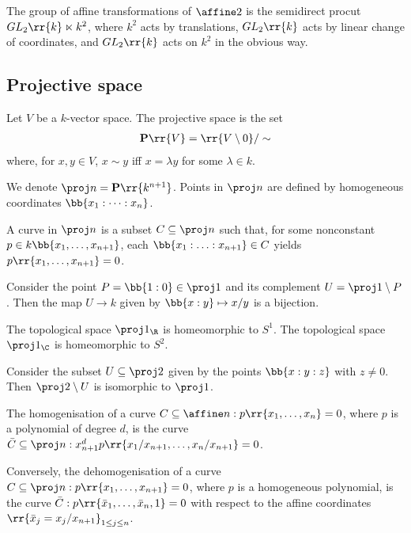 \documentclass{article}
\begin{document}
\begin{proposition}
  The group of affine transformations of $\affine 2$ is the semidirect procut
  $GL_2\rr{k}\ltimes k^2$, where $k^2$ acts by translations, $GL_2\rr{k}$ acts by
  linear change of coordinates, and $GL_2\rr{k}$ acts on $k^2$ in the obvious way.
\end{proposition}

\subsection{Projective space}\label{sec:projective_space}

\begin{definition}
  Let $V$ be a $k$-vector space. The projective space is the set
  \begin{align*}
    \mathbf P\rr{V} = \rr{V\setminus 0} / \sim
  \end{align*}
  where, for $x,y\in V$, $x\sim y$ iff $x=\lambda y$ for some $\lambda\in k$.

  We denote $\proj n = \mathbf P\rr{k^{n+1}}$.
  Points in $\proj n$ are defined by homogeneous coordinates
  $\bb{x_1 : \cdots : x_n}$.
\end{definition}

\begin{definition}
  A curve in $\proj n$ is a subset $C\subseteq\proj n$ such that, for some
  nonconstant $p\in k\bb{x_1,\ldots,x_{n+1}}$, each $\bb{x_1:\ldots:x_{n+1}}\in C$
  yields $p\rr{x_1,\ldots,x_{n+1}}=0$.
\end{definition}

\begin{proposition}
  Consider the point $P=\bb{1:0}\in\proj 1$ and its complement
  $U=\proj 1\setminus P$. Then the map $U\to k$ given by $\bb{x:y}\mapsto x/y$
  is a bijection.
\end{proposition}

\begin{theorem}
  The topological space $\proj 1_{\R}$ is homeomorphic to $S^1$. The topological space
  $\proj 1_{\C}$ is homeomorphic to $S^2$.
\end{theorem}

\begin{proposition}
  Consider the subset $U\subseteq\proj 2$ given by the points $\bb{x:y:z}$ with
  $z\neq 0$. Then $\proj 2\setminus U$ is isomorphic to $\proj 1$.
\end{proposition}

\begin{definition}
  The homogenisation of a curve $C\subseteq\affine n:p\rr{x_1,\ldots,x_n}=0$, where
  $p$ is a polynomial of degree $d$, is the curve
  $\bar C\subseteq\proj n:x_{n+1}^d p\rr{x_1/x_{n+1},\ldots,x_n/x_{n+1}}=0$.

  Conversely, the dehomogenisation of a curve $C\subseteq\proj n:p\rr{x_1,\ldots,x_{n+1}}=0$,
  where $p$ is a homogeneous polynomial, is the curve $\bar C:p\rr{\bar x_1,\ldots,\bar x_n,1}=0$
  with respect to the affine coordinates $\rr{\bar x_j = x_j / x_{n+1}}_{1\leq j\leq n}$.
\end{definition}
\end{document}
